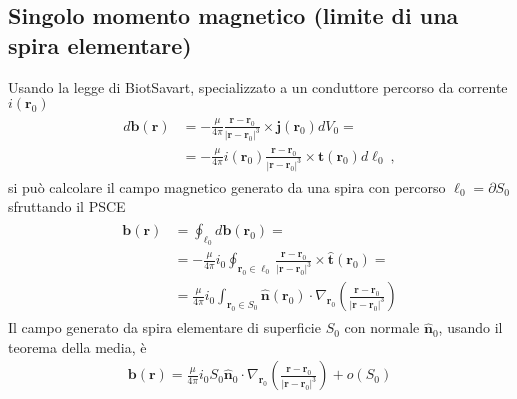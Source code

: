 \documentclass[letterpaper,10pt,italian]{jupyterBook}
\begin{document}
\subsection{Singolo momento magnetico (limite di una spira elementare)}
\label{\detokenize{ch/media:singolo-momento-magnetico-limite-di-una-spira-elementare}}
\sphinxAtStartPar
Usando la legge di Biot\sphinxhyphen{}Savart, specializzato a un conduttore percorso da corrente \(i(\mathbf{r}_0)\)
\begin{equation*}
\begin{split}\begin{aligned}
  d \mathbf{b}(\mathbf{r})
  & = - \frac{\mu}{4 \pi} \frac{\mathbf{r} - \mathbf{r}_0}{|\mathbf{r} - \mathbf{r}_0|^3} \times \mathbf{j}(\mathbf{r}_0) d V_0 = \\
  & = - \frac{\mu}{4 \pi} i(\mathbf{r}_0) \frac{\mathbf{r} - \mathbf{r}_0}{|\mathbf{r} - \mathbf{r}_0|^3} \times \hat{\mathbf{t}}(\mathbf{r}_0) d \ell_0 \ ,
\end{aligned}\end{split}
\end{equation*}
\sphinxAtStartPar
si può calcolare il campo magnetico generato da una spira con percorso \(\ell_0 = \partial S_0\) sfruttando il PSCE
\begin{equation*}
\begin{split}\begin{aligned}
  \mathbf{b}(\mathbf{r})
  & = \oint_{\ell_0} d \mathbf{b}(\mathbf{r}_0) = \\
  & = - \frac{\mu}{4 \pi} i_0 \oint_{\mathbf{r}_0 \in \ell_0} \frac{\mathbf{r} - \mathbf{r}_0}{|\mathbf{r} - \mathbf{r}_0|^3} \times \hat{\mathbf{t}}(\mathbf{r}_0)  = \\
  & =   \frac{\mu}{4 \pi} i_0 \int_{\mathbf{r}_0 \in S_0} \hat{\mathbf{n}}(\mathbf{r}_0) \cdot \nabla_{\mathbf{r}_0} \left( \frac{\mathbf{r} - \mathbf{r}_0}{|\mathbf{r} - \mathbf{r}_0|^3} \right)
\end{aligned}\end{split}
\end{equation*}
\sphinxAtStartPar
Il campo generato da spira elementare di superficie \(S_0\) con normale \(\hat{\mathbf{n}}_0\), usando il teorema della media, è
\begin{equation*}
\begin{split}\mathbf{b}(\mathbf{r}) = \frac{\mu}{4 \pi} i_0 S_0 \hat{\mathbf{n}}_0 \cdot \nabla_{\mathbf{r}_0} \left( \frac{\mathbf{r} - \mathbf{r}_0}{|\mathbf{r} - \mathbf{r}_0|^3} \right) + o(S_0)\end{split}
\end{equation*}
\end{document}
